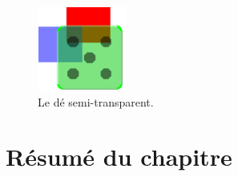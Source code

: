 \documentclass[a4paper,10pt,twoside]{book}
\begin{document}
\begin{figure}[ht]
	\centerline{\includegraphics[scale=0.7]{multiMorphs}}
	\caption{Le dé semi-transparent.}
\end{figure}




\section{Résumé du chapitre}
\end{document}
